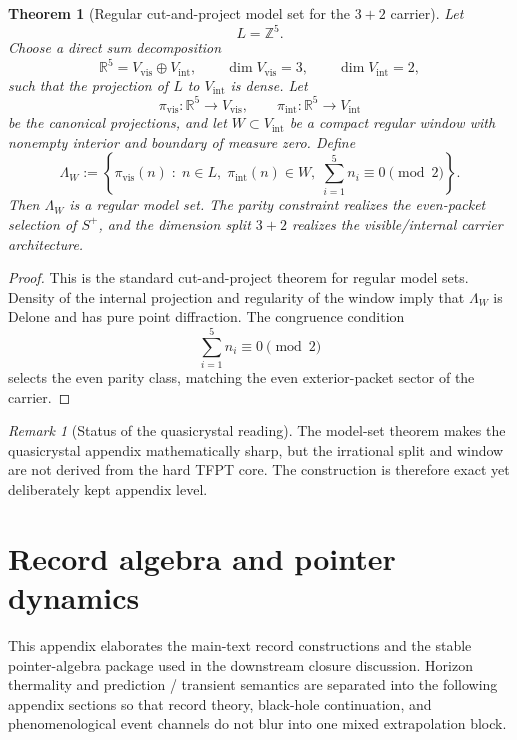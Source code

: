 \documentclass[11pt,a4paper]{article}
\newtheorem{theorem}{Theorem}[section]
\theoremstyle{definition}
\theoremstyle{remark}
\newtheorem*{remark}{Remark}
\begin{document}
\begin{theorem}[Regular cut-and-project model set for the \texorpdfstring{$3+2$}{3+2} carrier]
\label{thm:cut-project-model-set}
Let
\[
L=\mathbb Z^5.
\]
Choose a direct sum decomposition
\[
\mathbb R^5=V_{\mathrm{vis}}\oplus V_{\mathrm{int}},
\qquad
\dim V_{\mathrm{vis}}=3,
\qquad
\dim V_{\mathrm{int}}=2,
\]
such that the projection of $L$ to $V_{\mathrm{int}}$ is dense. Let
\[
\pi_{\mathrm{vis}}:\mathbb R^5\to V_{\mathrm{vis}},
\qquad
\pi_{\mathrm{int}}:\mathbb R^5\to V_{\mathrm{int}}
\]
be the canonical projections, and let $W\subset V_{\mathrm{int}}$ be a compact regular window with
nonempty interior and boundary of measure zero. Define
\[
\Lambda_W
:=
\left\{
\pi_{\mathrm{vis}}(n)\;:\;
n\in L,\;
\pi_{\mathrm{int}}(n)\in W,\;
\sum_{i=1}^5 n_i\equiv 0\!\!\!\pmod 2
\right\}.
\]
Then $\Lambda_W$ is a regular model set. The parity constraint realizes the even-packet selection of
$S^+$, and the dimension split $3+2$ realizes the visible/internal carrier architecture.
\end{theorem}

\begin{proof}
This is the standard cut-and-project theorem for regular model sets. Density of the internal
projection and regularity of the window imply that $\Lambda_W$ is Delone and has pure point
diffraction. The congruence condition
\[
\sum_{i=1}^5 n_i\equiv 0\!\!\!\pmod 2
\]
selects the even parity class, matching the even exterior-packet sector of the carrier.
\end{proof}

\begin{remark}[Status of the quasicrystal reading]
The model-set theorem makes the quasicrystal appendix mathematically sharp, but the irrational split
and window are not derived from the hard TFPT core. The construction is therefore exact yet
deliberately kept appendix level.
\end{remark}

\section{Record algebra and pointer dynamics}
\label{app:record}

This appendix elaborates the main-text record constructions and the stable pointer-algebra package
used in the downstream closure discussion. Horizon thermality and prediction / transient semantics
are separated into the following appendix sections so that record theory, black-hole continuation,
and phenomenological event channels do not blur into one mixed extrapolation block.
\end{document}
